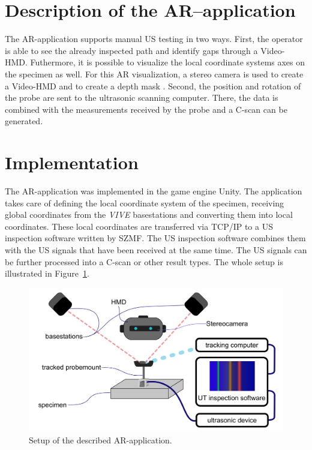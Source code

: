 \documentclass{VRARWorkshop}
\begin{document}
\section{Description of the AR--application}
The AR-application supports manual US testing in two ways.
First, the operator is able to see the already inspected path and identify gaps through a {\sc Video-HMD}.
Futhermore, it is possible to visualize the local coordinate systems axes on the specimen as well.
For this AR visualization, a stereo camera is used to create a {\sc Video-HMD} and to create a depth mask \cite{dorner_virtual_2013}.
Second, the position and rotation of the probe are sent to the ultrasonic scanning computer.
There, the data is combined with the measurements received by the probe and a C-scan can be generated.

\section{Implementation}
The AR-application was implemented in the game engine Unity.
The application takes care of defining the local coordinate system of the specimen, receiving global coordinates from the \textit{VIVE} basestations and converting them into local coordinates.
These local coordinates are transferred via TCP/IP to a US inspection software written by SZMF.
The US inspection software combines them with the US signals that have been received at the same time.
The US signals can be further processed into a C-scan or other result types.
The whole setup is illustrated in Figure~\ref{fig:Setup}.
\begin{figure}[h!]
    \begin{center}
        \includegraphics[width=140mm]{images/Setup-ARUS}
        \caption{\label{fig:Setup} Setup of the described AR-application.}
    \end{center}
\end{figure}
\end{document}
